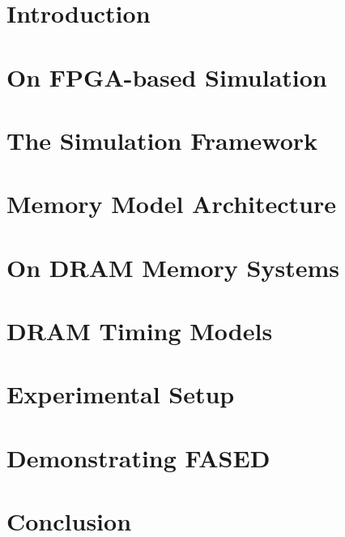 \documentclass[masters]{ucbthesis}
\begin{document}
\pagestyle{headings}

\begin{abstract}

\end{abstract}

\chapter{Introduction}



\chapter{On FPGA-based Simulation}



\chapter{The Simulation Framework}\label{sec:framework}



\chapter{Memory Model Architecture}



\chapter{On DRAM Memory Systems}



\chapter{DRAM Timing Models}\label{sec:dram-timing-model}



\chapter{Experimental Setup}



\chapter{Demonstrating \textsc{FASED}}\label{sec:evaluation}



\chapter{Conclusion}



\printbibliography
\end{document}
